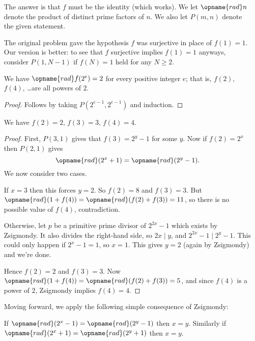 \documentclass[11pt,twoside]{scrartcl}
\begin{document}
\begin{soln}
    The answer is that $f$ must be the identity (which works).
We let $\opname{rad} n$ denote the product of distinct prime factors of $n$.
We also let $P(m,n)$ denote the given statement.

\begin{remark*}
	The original problem gave the hypothesis $f$ was surjective
	in place of $f(1)=1$.
	Our version is better:
	to see that $f$ surjective implies $f(1)=1$ anyways,
	consider $P(1,N-1)$ if $f(N)=1$ held for any $N \ge 2$.
\end{remark*}

\begin{claim*}
	We have $\opname{rad} f(2^e) =2$ for every positive integer $e$;
	that is, $f(2)$, $f(4)$, \dots are all powers of $2$.
\end{claim*}
\begin{proof}
	Follows by taking $P(2^{e-1}, 2^{e-1})$ and induction.
\end{proof}

\begin{claim*}
	We have $f(2) = 2$, $f(3) = 3$, $f(4) = 4$.
\end{claim*}
\begin{proof}
	First, $P(3,1)$ gives that $f(3) = 2^y-1$ for some $y$.
	Now if $f(2) = 2^x$ then $P(2,1)$ gives
	\[ \opname{rad}(2^x+1) = \opname{rad}(2^y-1). \]
	We now consider two cases.
	\begin{itemize}
		\ii If $x = 3$ then this forces $y = 2$.
		So $f(2) = 8$ and $f(3) = 3$.
		But $\opname{rad} (1+f(4)) = \opname{rad} (f(2)+f(3)) = 11$,
		so there is no possible value of $f(4)$, contradiction.

		\ii Otherwise, let $p$ be a primitive prime divisor of $2^{2x}-1$
		which exists by Zsigmondy.
		It also divides the right-hand side, so $2x \mid y$,
		and $2^{2x}-1 \mid 2^y-1$.
		This could only happen if $2^x-1=1$, so $x=1$.
		This gives $y=2$ (again by Zsigmondy) and we're done.
	\end{itemize}
	Hence $f(2) = 2$ and $f(3) = 3$.
	Now $\opname{rad} (1+f(4)) = \opname{rad} (f(2)+f(3)) = 5$,
	and since $f(4)$ is a power of $2$,
	Zsigmondy implies $f(4) = 4$.
\end{proof}

Moving forward, we apply the following simple consequence of Zsigmondy:
\begin{lemma*}
	If $\opname{rad}(2^x-1) = \opname{rad}(2^y-1)$ then $x=y$.
	Similarly if $\opname{rad}(2^x+1) = \opname{rad}(2^y+1)$ then $x=y$.
\end{lemma*}


\end{soln}
\end{document}
